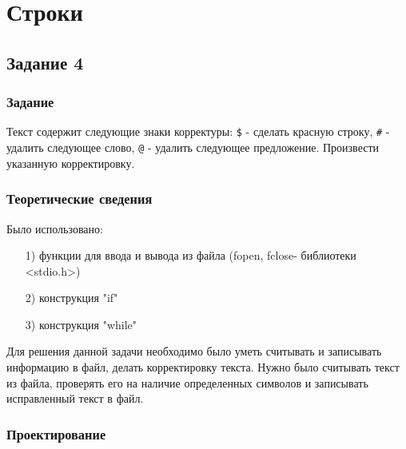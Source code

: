 \documentclass[12pt,a4paper]{report}
\begin{document}
\chapter{Строки}

\section{Задание 4}

\subsection{Задание}

Текст содержит следующие знаки корректуры: \verb-$- - сделать красную строку, \verb-#- - удалить следующее слово, \verb-@- - удалить следующее предложение. Произвести указанную корректировку.
\subsection{Теоретические сведения}
Было использовано:
\begin{enumerate}
\item[1)] функции для ввода и вывода из файла (fopen, fclose- библиотеки <stdio.h>)
\item[2)] конструкция "if"
\item[3)] конструкция "while"
\end{enumerate}
Для решения данной задачи необходимо было уметь считывать и записывать информацию в файл, делать корректировку текста.
Нужно было считывать текст из файла, проверять его на наличие определенных символов и записывать исправленный текст в файл.
\subsection{Проектирование}
\end{document}
